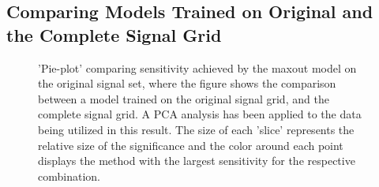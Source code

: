 \subsection{Comparing Models Trained on Original and the Complete Signal Grid}\label{appendix:BigVsSmall}
\begin{figure}[H]
    \caption['Pie-plot' comparing sensitivity achieved by the maxout model on the original signal set, where the figure shows the comparison between a model trained 
    on the original signal grid, and the complete signal grid.]{'Pie-plot' comparing sensitivity achieved by the maxout model on the original signal set, where the figure 
    shows the comparison between a model trained on the original signal grid, and the complete signal grid. A \ac{PCA} analysis has been applied to the data being utilized 
    in this result. The size of each 'slice' represents the relative size of the significance and the color around each 
    point displays the method with the largest sensitivity for the respective combination.}
    \label{fig:BigVsLittleSetMaxOut}
\end{figure}
